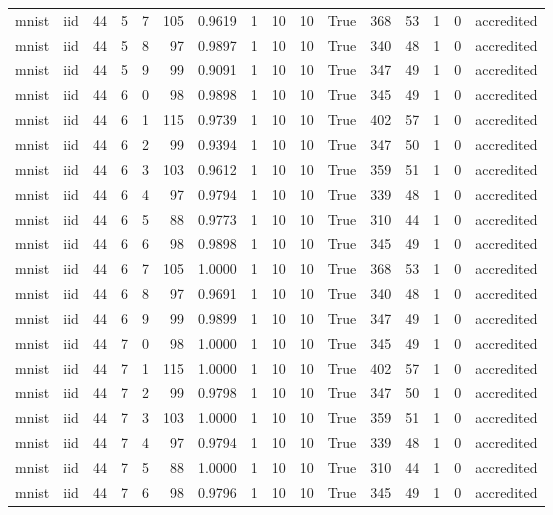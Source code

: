 \begin{tabular}{llrrrrrrrrrrrrrl}
mnist & iid & 44 & 5 & 7 & 105 & 0.9619 & 1 & 10 & 10 & True & 368 & 53 & 1 & 0 & accredited \\
mnist & iid & 44 & 5 & 8 & 97 & 0.9897 & 1 & 10 & 10 & True & 340 & 48 & 1 & 0 & accredited \\
mnist & iid & 44 & 5 & 9 & 99 & 0.9091 & 1 & 10 & 10 & True & 347 & 49 & 1 & 0 & accredited \\
mnist & iid & 44 & 6 & 0 & 98 & 0.9898 & 1 & 10 & 10 & True & 345 & 49 & 1 & 0 & accredited \\
mnist & iid & 44 & 6 & 1 & 115 & 0.9739 & 1 & 10 & 10 & True & 402 & 57 & 1 & 0 & accredited \\
mnist & iid & 44 & 6 & 2 & 99 & 0.9394 & 1 & 10 & 10 & True & 347 & 50 & 1 & 0 & accredited \\
mnist & iid & 44 & 6 & 3 & 103 & 0.9612 & 1 & 10 & 10 & True & 359 & 51 & 1 & 0 & accredited \\
mnist & iid & 44 & 6 & 4 & 97 & 0.9794 & 1 & 10 & 10 & True & 339 & 48 & 1 & 0 & accredited \\
mnist & iid & 44 & 6 & 5 & 88 & 0.9773 & 1 & 10 & 10 & True & 310 & 44 & 1 & 0 & accredited \\
mnist & iid & 44 & 6 & 6 & 98 & 0.9898 & 1 & 10 & 10 & True & 345 & 49 & 1 & 0 & accredited \\
mnist & iid & 44 & 6 & 7 & 105 & 1.0000 & 1 & 10 & 10 & True & 368 & 53 & 1 & 0 & accredited \\
mnist & iid & 44 & 6 & 8 & 97 & 0.9691 & 1 & 10 & 10 & True & 340 & 48 & 1 & 0 & accredited \\
mnist & iid & 44 & 6 & 9 & 99 & 0.9899 & 1 & 10 & 10 & True & 347 & 49 & 1 & 0 & accredited \\
mnist & iid & 44 & 7 & 0 & 98 & 1.0000 & 1 & 10 & 10 & True & 345 & 49 & 1 & 0 & accredited \\
mnist & iid & 44 & 7 & 1 & 115 & 1.0000 & 1 & 10 & 10 & True & 402 & 57 & 1 & 0 & accredited \\
mnist & iid & 44 & 7 & 2 & 99 & 0.9798 & 1 & 10 & 10 & True & 347 & 50 & 1 & 0 & accredited \\
mnist & iid & 44 & 7 & 3 & 103 & 1.0000 & 1 & 10 & 10 & True & 359 & 51 & 1 & 0 & accredited \\
mnist & iid & 44 & 7 & 4 & 97 & 0.9794 & 1 & 10 & 10 & True & 339 & 48 & 1 & 0 & accredited \\
mnist & iid & 44 & 7 & 5 & 88 & 1.0000 & 1 & 10 & 10 & True & 310 & 44 & 1 & 0 & accredited \\
mnist & iid & 44 & 7 & 6 & 98 & 0.9796 & 1 & 10 & 10 & True & 345 & 49 & 1 & 0 & accredited \\

\end{tabular}
